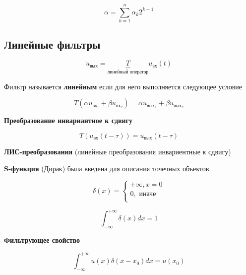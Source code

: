 \begin{equation*}
    \alpha=\sum_{k=1}^n \alpha_k 2^{k-1}
\end{equation*}

\subsection{Линейные фильтры}

\begin{equation*}
    u_{\text{вых}} = \underbrace{T}_{\text{линейный оператор}} u_{\text{вх}}(t)
\end{equation*}

Фильтр называется \textbf{линейным} если для него выполняется следующее условие

\begin{equation*}
    T(\alpha u_{\text{вх}_1} + \beta u_{\text{вх}_2}) = \alpha u_{\text{вых}_1} + \beta u_{\text{вых}_2}
\end{equation*}

\textbf{Преобразование инвариантное к сдвигу}

\begin{equation*}
    T(u_{\text{вх}}(t-\tau)) = u_\text{вых}(t-\tau)
\end{equation*}

\textbf{ЛИС-преобразования} (линейные преобразования инвариентные к сдвигу)

\textbf{S-функция} (Дирак) была введена для описания точечных объектов.

\begin{equation*}
    \delta(x) =
    \begin{cases}
        +\infty, x = 0 \\
        0, \text{ иначе} \\
    \end{cases}
\end{equation*}

\begin{equation*}
    \int_{-\infty}^{+\infty} \delta(x) dx = 1
\end{equation*}

\textbf{Фильтрующее свойство}

\begin{equation*}
    \int_{-\infty}^{+\infty} u(x) \delta(x-x_0) dx = u(x_0)
\end{equation*}
